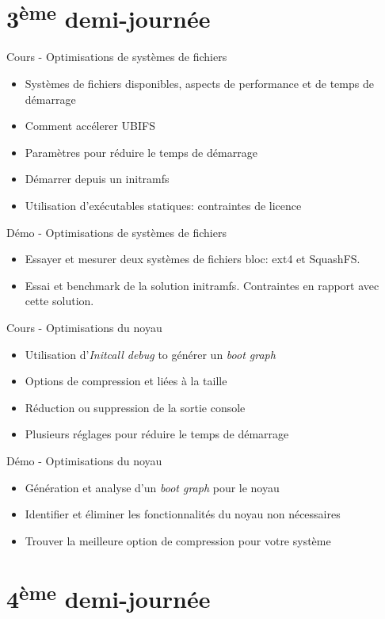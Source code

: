 \documentclass[a4paper,12pt,obeyspaces,spaces,hyphens]{article}
\begin{document}
\section{3\textsuperscript{ème} demi-journée}

\feagendatwocolumn
{Cours - Optimisations de systèmes de fichiers}
{
  \begin{itemize}
  \item Systèmes de fichiers disponibles, aspects de performance et de temps de démarrage
  \item Comment accélerer UBIFS
  \item Paramètres pour réduire le temps de démarrage
  \item Démarrer depuis un initramfs
  \item Utilisation d'exécutables statiques: contraintes de licence
  \end{itemize}
}
{Démo - Optimisations de systèmes de fichiers}
{
 \begin{itemize}
 \item Essayer et mesurer deux systèmes de fichiers bloc: ext4 et SquashFS.
 \item Essai et benchmark de la solution initramfs. Contraintes
       en rapport avec cette solution.
 \end{itemize}
}

\feagendatwocolumn
{Cours - Optimisations du noyau}
{
  \begin{itemize}
  \item Utilisation d'{\em Initcall debug} to générer un {\em boot graph}
  \item Options de compression et liées à la taille
  \item Réduction ou suppression de la sortie console
  \item Plusieurs réglages pour réduire le temps de démarrage
  \end{itemize}
}
{Démo - Optimisations du noyau}
{
 \begin{itemize}
 \item Génération et analyse d'un {\em boot graph} pour le noyau
 \item Identifier et éliminer les fonctionnalités du noyau non nécessaires
 \item Trouver la meilleure option de compression pour votre système
 \end{itemize}
}

\section{4\textsuperscript{ème} demi-journée}
\end{document}
